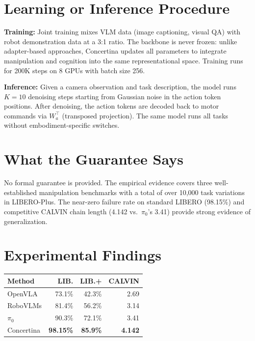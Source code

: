 \documentclass[10pt,twocolumn]{article}
\begin{document}
\section{Learning or Inference Procedure}

\textbf{Training:}
Joint training mixes VLM data (image captioning, visual QA) with robot demonstration data at a 3:1 ratio.
The backbone is never frozen: unlike adapter-based approaches, Concertina updates all parameters to integrate manipulation and cognition into the same representational space.
Training runs for 200K steps on 8 GPUs with batch size 256.

\textbf{Inference:}
Given a camera observation and task description, the model runs $K=10$ denoising steps starting from Gaussian noise in the action token positions.
After denoising, the action tokens are decoded back to motor commands via $W_a^\top$ (transposed projection).
The same model runs all tasks without embodiment-specific switches.

\section{What the Guarantee Says}

No formal guarantee is provided.
The empirical evidence covers three well-established manipulation benchmarks with a total of over 10,000 task variations in LIBERO-Plus.
The near-zero failure rate on standard LIBERO (98.15\%) and competitive CALVIN chain length (4.142 vs.\ $\pi_0$'s 3.41) provide strong evidence of generalization.

\section{Experimental Findings}

\begin{center}
\small
\begin{tabular}{lrrr}
\toprule
\textbf{Method} & \textbf{LIB.} & \textbf{LIB.+} & \textbf{CALVIN} \\
\midrule
OpenVLA          & 73.1\% & 42.3\% & 2.69 \\
RoboVLMs         & 81.4\% & 56.2\% & 3.14 \\
$\pi_0$          & 90.3\% & 72.1\% & 3.41 \\
Concertina       & \textbf{98.15\%} & \textbf{85.9\%} & \textbf{4.142} \\
\bottomrule
\end{tabular}
\end{center}
\end{document}
